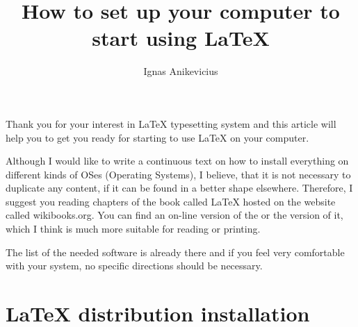 \documentclass[
    draft
]{scrartcl}
\title{How to set up your computer to start using \LaTeX{}}
\author{Ignas Anikevicius}
\begin{document}
\maketitle
\tableofcontents
\listoftodos{\vskip 1em}

%
Thank you for your interest in \LaTeX{} typesetting system and this article
    will help you to get you ready for starting to use \LaTeX{} on your
    computer.

%
Although I would like to write a continuous text on how to install
    everything on different kinds of OSes (Operating Systems), I believe, that
    it is not necessary to duplicate any content, if it can be found in a better
    shape elsewhere. 
%
Therefore, I suggest you reading chapters of the book called \LaTeX{} hosted on
    the website called wikibooks.org. 
%
You can find an on-line version of the
     or the
    version of it, which I think is much more suitable for reading or printing.

%
The list of the needed software is already there and if you feel very
    comfortable with your system, no specific directions should be necessary.


\section{\LaTeX{} distribution installation}
\end{document}
